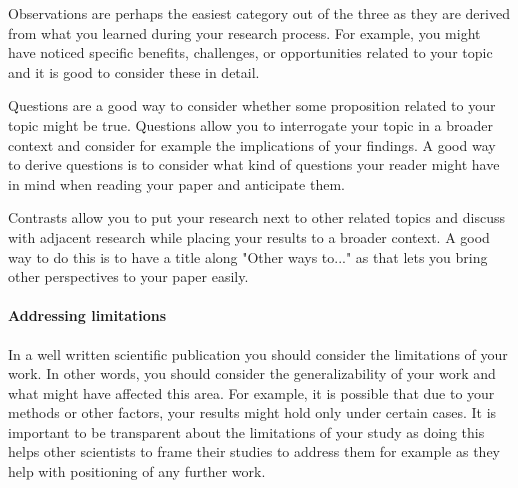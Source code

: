 
Observations are perhaps the easiest category out of the three as they are derived from what you learned during your research process.
For example, you might have noticed specific benefits, challenges, or opportunities related to your topic and it is good to consider these in detail.

Questions are a good way to consider whether some proposition related to your topic might be true.
Questions allow you to interrogate your topic in a broader context and consider for example the implications of your findings.
A good way to derive questions is to consider what kind of questions your reader might have in mind when reading your paper and anticipate them.

Contrasts allow you to put your research next to other related topics and discuss with adjacent research while placing your results to a broader context.
A good way to do this is to have a title along "Other ways to..." as that lets you bring other perspectives to your paper easily.



\paragraph{Addressing limitations}

In a well written scientific publication you should consider the limitations of your work.
In other words, you should consider the generalizability of your work and what might have affected this area.
For example, it is possible that due to your methods or other factors, your results might hold only under certain cases.
It is important to be transparent about the limitations of your study as doing this helps other scientists to frame their studies to address them for example as they help with positioning of any further work.

